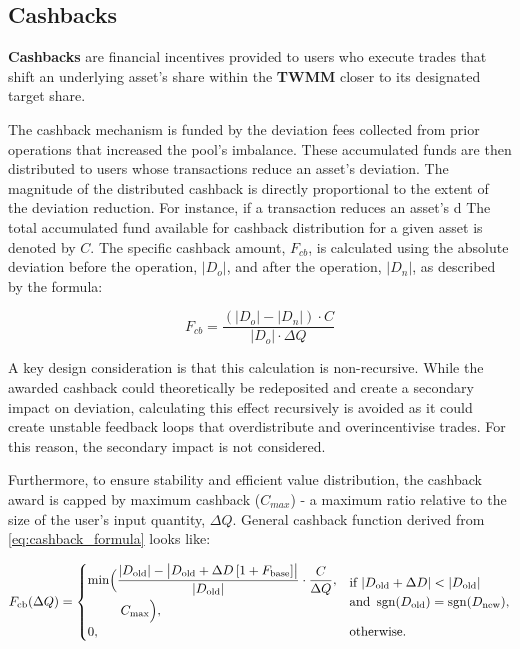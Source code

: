 \subsection{Cashbacks}
\textbf{Cashbacks} are financial incentives provided to users who execute trades that shift an underlying asset's share within the \textbf{TWMM} closer to its designated target share.

The cashback mechanism is funded by the deviation fees collected from prior operations that increased the pool's imbalance. These accumulated funds are then distributed to users whose transactions reduce an asset's deviation. The magnitude of the distributed cashback is directly proportional to the extent of the deviation reduction. For instance, if a transaction reduces an asset's d 
The total accumulated fund available for cashback distribution for a given asset is denoted by $C$. The specific cashback amount, $F_{cb}$, is calculated using the absolute deviation before the operation, $|D_o|$, and after the operation, $|D_n|$, as described by the formula:

\begin{equation}
	\label{eq:cashback_formula}
	F_{cb} = \frac{(|D_o| - |D_n|) \cdot C}{|D_o| \cdot \Delta Q} 
\end{equation}

A key design consideration is that this calculation is non-recursive. While the awarded cashback could theoretically be redeposited and create a secondary impact on deviation, calculating this effect recursively is avoided as it could create unstable feedback loops that overdistribute and overincentivise trades. For this reason, the secondary impact is not considered. 

Furthermore, to ensure stability and efficient value distribution, the cashback award is capped by  maximum cashback ($C_{max}$) - a maximum ratio relative to the size of the user's input quantity, $\Delta Q$. General cashback function derived from \ref{eq:cashback_formula} looks like:

\begin{equation}
	\label{eq:invariant_swap_cashback_function}
	F_{\mathrm{cb}}(\Delta Q)
	=
	\begin{cases}
		\displaystyle
		\begin{aligned}
			\min\Bigl(&
			\frac{\lvert D_{\mathrm{old}}\rvert
				- \bigl\lvert D_{\mathrm{old}}
				+ \Delta D\,[1 + F_{\mathrm{base}}]\bigr\rvert}
			{\lvert D_{\mathrm{old}}\rvert}
			\cdot \frac{C}{\Delta Q},\\
			&\;C_{\max}
			\Bigr),
		\end{aligned}
		&
		\begin{aligned}
			&\text{if }\lvert D_{\mathrm{old}} + \Delta D\rvert
			< \lvert D_{\mathrm{old}}\rvert\\
			& \text{and }\operatorname{sgn}(D_{\mathrm{old}})
			= \operatorname{sgn}(D_{\mathrm{new}}),
		\end{aligned}
		\\[3ex]
		0,
		& \text{otherwise.}
	\end{cases}
\end{equation}



